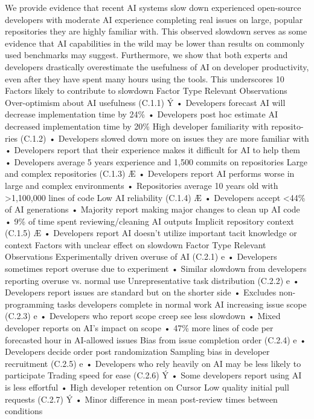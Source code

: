 We provide evidence that recent AI systems slow down experienced open-source developers with
moderate AI experience completing real issues on large, popular repositories they are highly familiar
with. This observed slowdown serves as some evidence that AI capabilities in the wild may be lower
than results on commonly used benchmarks may suggest.
Furthermore, we show that both experts and developers drastically overestimate the usefulness of AI
on developer productivity, even after they have spent many hours using the tools. This underscores
10
Factors likely to contribute to slowdown
Factor
Type
Relevant Observations
Over-optimism
about
AI
usefulness
(C.1.1)
Ý
• Developers forecast AI will decrease implementation time by 24\%
• Developers post hoc estimate AI decreased implementation time by 20\%
High developer familiarity with reposito-
ries (C.1.2)
• Developers slowed down more on issues they are more familiar with
• Developers report that their experience makes it difficult for AI to help them
• Developers average 5 years experience and 1,500 commits on repositories
Large and complex repositories (C.1.3)
Æ
• Developers report AI performs worse in large and complex environments
• Repositories average 10 years old with >1,100,000 lines of code
Low AI reliability (C.1.4)
Æ
• Developers accept <44\% of AI generations
• Majority report making major changes to clean up AI code
• 9\% of time spent reviewing/cleaning AI outputs
Implicit repository context (C.1.5)
Æ
• Developers report AI doesn’t utilize important tacit knowledge or context
Factors with unclear effect on slowdown
Factor
Type
Relevant Observations
Experimentally driven overuse of AI
(C.2.1)
e
• Developers sometimes report overuse due to experiment
• Similar slowdown from developers reporting overuse vs. normal use
Unrepresentative
task
distribution
(C.2.2)
e
• Developers report issues are standard but on the shorter side
• Excludes non-programming tasks developers complete in normal work
AI increasing issue scope (C.2.3)
e
• Developers who report scope creep see less slowdown
• Mixed developer reports on AI’s impact on scope
• 47\% more lines of code per forecasted hour in AI-allowed issues
Bias from issue completion order (C.2.4)
e
• Developers decide order post randomization
Sampling bias in developer recruitment
(C.2.5)
e
• Developers who rely heavily on AI may be less likely to participate
Trading speed for ease (C.2.6)
Ý
• Some developers report using AI is less effortful
• High developer retention on Cursor
Low quality initial pull requests (C.2.7)
Ý
• Minor difference in mean post-review times between conditions
